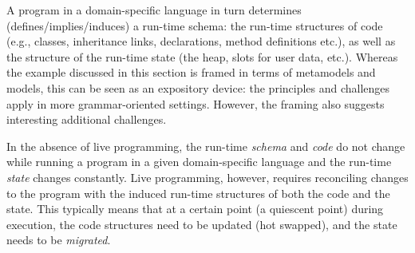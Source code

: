 \documentclass[english,crc]{programming}
\begin{document}
A program in a domain-specific language in turn determines (defines/implies/induces) a run-time
schema: the run-time structures of code (e.g., classes, inheritance links, declarations, method
definitions etc.), as well as the structure of the run-time state (the heap, slots for user data, etc.).
Whereas the example discussed in this section is framed in terms of metamodels and models, this can
be seen as an expository device: the principles and challenges apply in more grammar-oriented settings.
However, the framing also suggests interesting additional challenges.

In the absence of live programming, the run-time \emph{schema} and \emph{code} do not change while
running a program in a given domain-specific language and the run-time \emph{state} changes constantly.
Live programming, however, requires reconciling changes to the program with the induced run-time structures
of both the code and the state. This typically means that at a certain point (a quiescent point)
during execution, the code structures need to be updated (hot swapped), and the state needs to be
\textit{migrated}.
\end{document}
